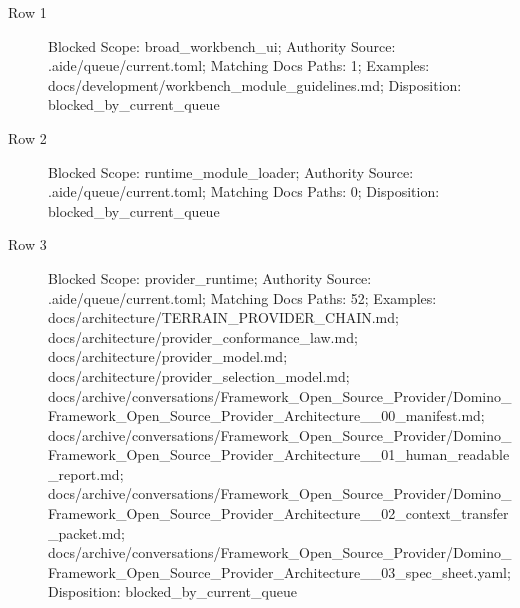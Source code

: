 \documentclass[9pt,a4paper,openany]{book}
\begin{document}
\begin{description}
\item[Row 1] Blocked Scope: broad\_\allowbreak{}workbench\_\allowbreak{}ui; Authority Source: .\allowbreak{}aide/\allowbreak{}queue/\allowbreak{}current.\allowbreak{}toml; Matching Docs Paths: 1; Examples: docs/\allowbreak{}development/\allowbreak{}workbench\_\allowbreak{}module\_\allowbreak{}guidelines.\allowbreak{}md; Disposition: blocked\_\allowbreak{}by\_\allowbreak{}current\_\allowbreak{}queue
\item[Row 2] Blocked Scope: runtime\_\allowbreak{}module\_\allowbreak{}loader; Authority Source: .\allowbreak{}aide/\allowbreak{}queue/\allowbreak{}current.\allowbreak{}toml; Matching Docs Paths: 0; Disposition: blocked\_\allowbreak{}by\_\allowbreak{}current\_\allowbreak{}queue
\item[Row 3] Blocked Scope: provider\_\allowbreak{}runtime; Authority Source: .\allowbreak{}aide/\allowbreak{}queue/\allowbreak{}current.\allowbreak{}toml; Matching Docs Paths: 52; Examples: docs/\allowbreak{}architecture/\allowbreak{}TERRAIN\_\allowbreak{}PROVIDER\_\allowbreak{}CHAIN.\allowbreak{}md; docs/\allowbreak{}architecture/\allowbreak{}provider\_\allowbreak{}conformance\_\allowbreak{}law.\allowbreak{}md; docs/\allowbreak{}architecture/\allowbreak{}provider\_\allowbreak{}model.\allowbreak{}md; docs/\allowbreak{}architecture/\allowbreak{}provider\_\allowbreak{}selection\_\allowbreak{}model.\allowbreak{}md; docs/\allowbreak{}archive/\allowbreak{}conversations/\allowbreak{}Framework\_\allowbreak{}Open\_\allowbreak{}Source\_\allowbreak{}Provider/\allowbreak{}Domino\_\allowbreak{}Framework\_\allowbreak{}Open\_\allowbreak{}Source\_\allowbreak{}Provider\_\allowbreak{}Architecture\_\allowbreak{}\_\allowbreak{}00\_\allowbreak{}manifest.\allowbreak{}md; docs/\allowbreak{}archive/\allowbreak{}conversations/\allowbreak{}Framework\_\allowbreak{}Open\_\allowbreak{}Source\_\allowbreak{}Provider/\allowbreak{}Domino\_\allowbreak{}Framework\_\allowbreak{}Open\_\allowbreak{}Source\_\allowbreak{}Provider\_\allowbreak{}Architecture\_\allowbreak{}\_\allowbreak{}01\_\allowbreak{}human\_\allowbreak{}readable\_\allowbreak{}report.\allowbreak{}md; docs/\allowbreak{}archive/\allowbreak{}conversations/\allowbreak{}Framework\_\allowbreak{}Open\_\allowbreak{}Source\_\allowbreak{}Provider/\allowbreak{}Domino\_\allowbreak{}Framework\_\allowbreak{}Open\_\allowbreak{}Source\_\allowbreak{}Provider\_\allowbreak{}Architecture\_\allowbreak{}\_\allowbreak{}02\_\allowbreak{}context\_\allowbreak{}transfer\_\allowbreak{}packet.\allowbreak{}md; docs/\allowbreak{}archive/\allowbreak{}conversations/\allowbreak{}Framework\_\allowbreak{}Open\_\allowbreak{}Source\_\allowbreak{}Provider/\allowbreak{}Domino\_\allowbreak{}Framework\_\allowbreak{}Open\_\allowbreak{}Source\_\allowbreak{}Provider\_\allowbreak{}Architecture\_\allowbreak{}\_\allowbreak{}03\_\allowbreak{}spec\_\allowbreak{}sheet.\allowbreak{}yaml; Disposition: blocked\_\allowbreak{}by\_\allowbreak{}current\_\allowbreak{}queue

\end{description}
\end{document}
